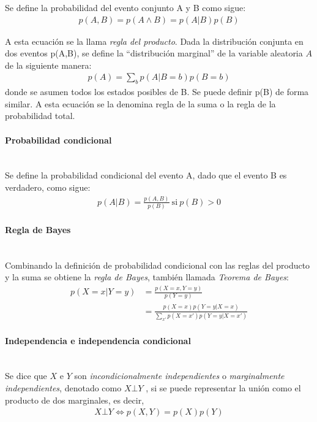 		Se define la probabilidad del evento conjunto A y B como sigue:
		\begin{align}
			p(A,B) = p(A \land B) = p(A|B)p(B)
		\end{align}

		A esta ecuación se la llama \textit{regla del producto}. Dada la distribución conjunta en dos eventos p(A,B), se define la ``distribución marginal'' de la variable aleatoria $A$ de la siguiente manera:
		\begin{align}
			p(A)=\sum_{b}p(A|B=b)p(B=b)
		\end{align}
		donde se asumen todos los estados posibles de B. Se puede definir p(B) de forma similar. A esta ecuación se la denomina regla de la suma o la regla de la probabilidad total.
		
	\paragraph*{Probabilidad condicional} ~\\
	
		Se define la probabilidad condicional del evento A, dado que el evento B es verdadero, como sigue:
		\begin{align}
			p(A|B) = \frac{p(A,B)}{p(B)} ~\text{si}~ p(B)>0
		\end{align}
		
	\paragraph*{Regla de Bayes} ~\\
		
		Combinando la definición de probabilidad condicional con las reglas del producto y la suma se obtiene la \textit{regla de Bayes}, también llamada \textit{Teorema de Bayes}:
		\begin{align}\label{eq:bayes}
			p(X=x|Y=y) &= \frac{p(X=x,Y=y)}{p(Y=y)} \\
			&= \frac{p(X=x)p(Y=y|X=x)}{\sum_{x'}p(X=x')p(Y=y|X=x')}
		\end{align}

	\paragraph*{Independencia e independencia condicional} ~\\
	
		Se dice que $X$ e $Y$ son \textit{incondicionalmente independientes} o \textit{marginalmente independientes}, denotado como $X \bot Y$	, si se puede representar la unión como el producto de dos marginales, es decir,
	\begin{align}
		X \bot Y \Longleftrightarrow p(X,Y) = p(X)p(Y)
	\end{align}			
			
